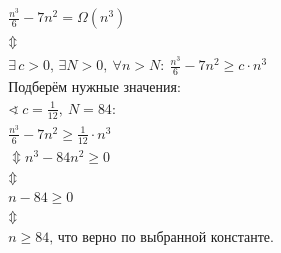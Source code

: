 \section{} 
\label{sec:1}
	\begin{gather*}
		\frac{n^3}{6} - 7n^2 = \Omega(n^3)
		\\
		\Updownarrow
		\\
		\exists \, c>0,\, \exists N>0,\: \forall n > N:\: \frac{n^3}{6} - 7n^2 \geq c\cdot n^3
		\\
		\text{Подберём нужные значения:}
		\\
		\sphericalangle \: c = \frac{1}{12},\: N = 84:
		\\
		\frac{n^3}{6} - 7n^2 \geq \frac{1}{12}\cdot n^3
		\\
		\Updownarrow
		n^3 - 84n^2 \geq 0
		\\
		\Updownarrow
		\\
		n - 84 \geq 0 
		\\
		\Updownarrow
		\\
		n \geq 84\text{, что верно по выбранной константе.}
	\end{gather*}
